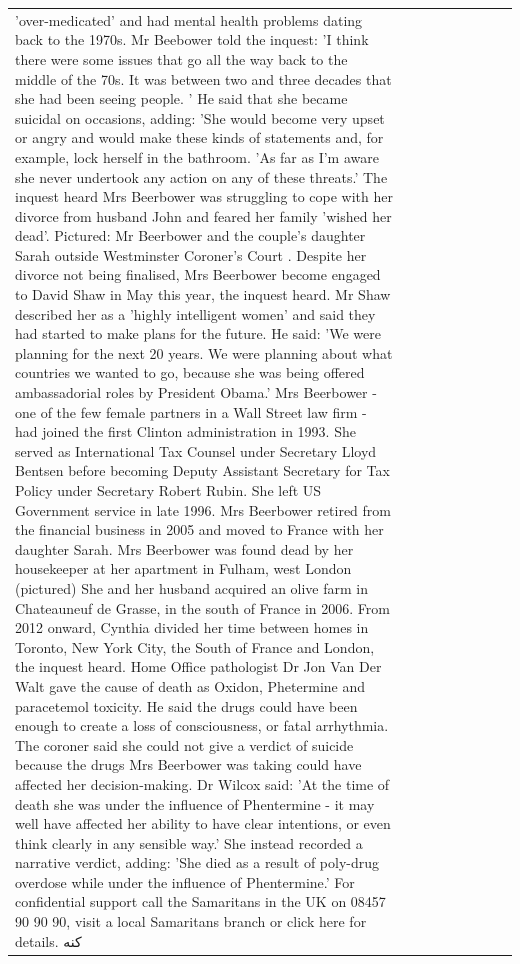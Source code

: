\begin{table}[H]
\begin{tabular}{lllrlllll}
'over-medicated' and had mental health problems dating back to the 1970s. Mr Beebower told the inquest: 'I think there were some issues that go all the way back to the middle of the 70s. It was between two and three decades that she had been seeing people. ' He said that she became suicidal on occasions, adding: 'She would become very upset or angry and would make these kinds of statements and, for example, lock herself in the bathroom. 'As far as I'm aware she never undertook any action on any of these threats.' The inquest heard Mrs Beerbower was struggling to cope with her divorce from husband John and feared her family 'wished her dead'. Pictured: Mr Beerbower and the couple's daughter Sarah outside Westminster Coroner's Court . Despite her divorce not being finalised, Mrs Beerbower become engaged to David Shaw in May this year, the inquest heard. Mr Shaw described her as a 'highly intelligent women' and said they had started to make plans for the future. He said: 'We were planning for the next 20 years. We were planning about what countries we wanted to go, because she was being offered ambassadorial roles by President Obama.' Mrs Beerbower - one of the few female partners in a Wall Street law firm - had joined the first Clinton administration in 1993. She served as International Tax Counsel under Secretary Lloyd Bentsen before becoming Deputy Assistant Secretary for Tax Policy under Secretary Robert Rubin. She left US Government service in late 1996. Mrs Beerbower retired from the financial business in 2005 and moved to France with her daughter Sarah. Mrs Beerbower was found dead by her housekeeper at her apartment in Fulham, west London (pictured) She and her husband acquired an olive farm in Chateauneuf de Grasse, in the south of France in 2006. From 2012 onward, Cynthia divided her time between homes in Toronto, New York City, the South of France and London, the inquest heard. Home Office pathologist Dr Jon Van Der Walt gave the cause of death as Oxidon, Phetermine and paracetemol toxicity. He said the drugs could have been enough to create a loss of consciousness, or fatal arrhythmia. The coroner said she could not give a verdict of suicide because the drugs Mrs Beerbower was taking could have affected her decision-making. Dr Wilcox said: 'At the time of death she was under the influence of Phentermine - it may well have affected her ability to have clear intentions, or even think clearly in any sensible way.' She instead recorded a narrative verdict, adding: 'She died as a result of poly-drug overdose while under the influence of Phentermine.' For confidential support call the Samaritans in the UK on 08457 90 90 90, visit a local Samaritans branch or click here for details. کنه \\

\end{tabular}
\end{table}
